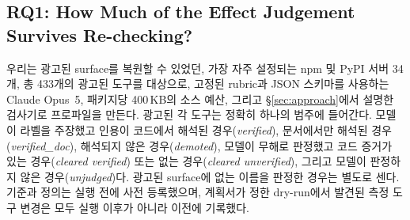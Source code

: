 \documentclass[acmsmall,screen,review,anonymous]{acmart}
\begin{document}
\subsection{RQ1: How Much of the Effect Judgement Survives Re-checking?}
\label{sec:rq1}

우리는 광고된 surface를 복원할 수 있었던, 가장 자주 설정되는 npm 및 PyPI 서버 34개, 총 433개의 광고된 도구를 대상으로, 고정된 rubric과 JSON 스키마를 사용하는 Claude Opus~5, 패키지당 400\,KB의 소스 예산, 그리고 \S\ref{sec:approach}에서 설명한 검사기로 프로파일을 만든다. 광고된 각 도구는 정확히 하나의 범주에 들어간다. 모델이 라벨을 주장했고 인용이 코드에서 해석된 경우(\emph{verified}), 문서에서만 해석된 경우(\emph{verified\_doc}), 해석되지 않은 경우(\emph{demoted}), 모델이 무해로 판정했고 코드 증거가 있는 경우(\emph{cleared verified}) 또는 없는 경우(\emph{cleared unverified}), 그리고 모델이 판정하지 않은 경우(\emph{unjudged})다. 광고된 surface에 없는 이름을 판정한 경우는 별도로 센다. 기준과 정의는 실행 전에 사전 등록했으며, 계획서가 정한 dry-run에서 발견된 측정 도구 변경은 모두 실행 이후가 아니라 이전에 기록했다.
\end{document}
